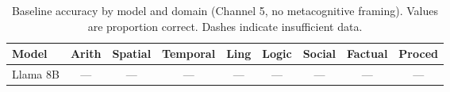 \begin{table}[ht]
\centering
\caption{Baseline accuracy by model and domain (Channel 5, no metacognitive framing).
  Values are proportion correct. Dashes indicate insufficient data.}
\label{tab:accuracy}
\begin{tabular}{lcccccccc}
\toprule
Model & Arith & Spatial & Temporal & Ling & Logic & Social & Factual & Proced \\
\midrule
        Llama 8B & — & — & — & — & — & — & — & — \\
\bottomrule
\end{tabular}
\end{table}
